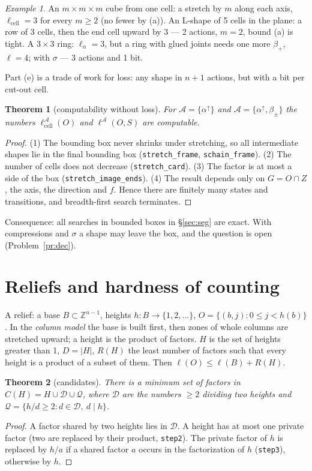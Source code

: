 \documentclass[11pt,a4paper]{article}
\theoremstyle{plain}
\newtheorem{theorem}{Theorem}[section]
\theoremstyle{definition}
\theoremstyle{remark}
\newtheorem*{example}{Example}
\newcommand{\Z}{\mathbb{Z}}
\newcommand{\lc}{\ell_{\mathrm{cell}}}
\newcommand{\lean}[1]{\texttt{#1}}
\begin{document}
\begin{example}
An $m\times m\times m$ cube from one cell: a stretch by $m$ along each axis, $\lc=3$ for every $m\ge2$ (no fewer by (a)). An L-shape of 5 cells in the plane: a row of 3 cells, then the end cell upward by 3 — 2 actions, $m=2$, bound (a) is tight. A $3\times3$ ring: $\ell_\alpha=3$, but a ring with glued joints needs one more $\beta_+$, $\ell=4$; with $\sigma$ — 3 actions and 1 bit.
\end{example}

Part (e) is a trade of work for loss: any shape in $n+1$ actions, but with a bit per cut-out cell.

\begin{theorem}[computability without loss]\label{thm:dec}
For $\mathcal A=\{\alpha^\uparrow\}$ and $\mathcal A=\{\alpha^\uparrow,\beta_\pm\}$ the numbers $\lc^{\mathcal A}(O)$ and $\ell^{\mathcal A}(O,S)$ are computable.
\end{theorem}
\begin{proof}
(1) The bounding box never shrinks under stretching, so all intermediate shapes lie in the final bounding box (\lean{stretch\_frame}, \lean{schain\_frame}). (2) The number of cells does not decrease (\lean{stretch\_card}). (3) The factor is at most a side of the box (\lean{stretch\_image\_ends}). (4) The result depends only on $G=O\cap Z$, the axis, the direction and $f$. Hence there are finitely many states and transitions, and breadth-first search terminates.
\end{proof}

Consequence: all searches in bounded boxes in §\ref{sec:seg} are exact. With compressions and $\sigma$ a shape may leave the box, and the question is open (Problem~\ref{pr:dec}).

\section{Reliefs and hardness of counting}\label{sec:reliefs}

A relief: a base $B\subset\Z^{n-1}$, heights $h\colon B\to\{1,2,\dots\}$, $O=\{(b,j):0\le j<h(b)\}$. In the \emph{column model} the base is built first, then zones of whole columns are stretched upward; a height is the product of factors. $H$ is the set of heights greater than 1, $D=|H|$, $R(H)$ the least number of factors such that every height is a product of a subset of them. Then $\ell(O)\le\ell(B)+R(H)$.

\begin{theorem}[candidates]\label{thm:cand}
There is a minimum set of factors in $C(H)=H\cup\mathcal D\cup\mathcal Q$, where $\mathcal D$ are the numbers $\ge2$ dividing two heights and $\mathcal Q=\{h/d\ge2: d\in\mathcal D,\ d\mid h\}$.
\end{theorem}
\begin{proof}
A factor shared by two heights lies in $\mathcal D$. A height has at most one private factor (two are replaced by their product, \lean{step2}). The private factor of $h$ is replaced by $h/a$ if a shared factor $a$ occurs in the factorization of $h$ (\lean{step3}), otherwise by $h$.
\end{proof}
\end{document}
